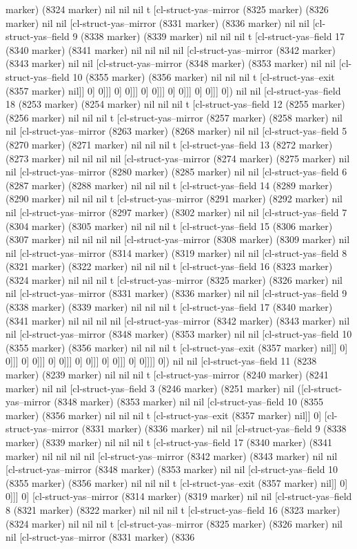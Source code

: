 {{marker) (8324 marker) nil nil nil t [cl-struct-yas--mirror (8325 marker) (8326 marker) nil nil [cl-struct-yas--mirror (8331 marker) (8336 marker) nil nil [cl-struct-yas--field 9 (8338 marker) (8339 marker) nil nil nil t [cl-struct-yas--field 17 (8340 marker) (8341 marker) nil nil nil nil [cl-struct-yas--mirror (8342 marker) (8343 marker) nil nil [cl-struct-yas--mirror (8348 marker) (8353 marker) nil nil [cl-struct-yas--field 10 (8355 marker) (8356 marker) nil nil nil t [cl-struct-yas--exit (8357 marker) nil]] 0] 0]]] 0] 0]]] 0] 0]]] 0] 0]]] 0] 0]]] 0]) nil nil [cl-struct-yas--field 18 (8253 marker) (8254 marker) nil nil nil t [cl-struct-yas--field 12 (8255 marker) (8256 marker) nil nil nil t [cl-struct-yas--mirror (8257 marker) (8258 marker) nil nil [cl-struct-yas--mirror (8263 marker) (8268 marker) nil nil [cl-struct-yas--field 5 (8270 marker) (8271 marker) nil nil nil t [cl-struct-yas--field 13 (8272 marker) (8273 marker) nil nil nil nil [cl-struct-yas--mirror (8274 marker) (8275 marker) nil nil [cl-struct-yas--mirror (8280 marker) (8285 marker) nil nil [cl-struct-yas--field 6 (8287 marker) (8288 marker) nil nil nil t [cl-struct-yas--field 14 (8289 marker) (8290 marker) nil nil nil t [cl-struct-yas--mirror (8291 marker) (8292 marker) nil nil [cl-struct-yas--mirror (8297 marker) (8302 marker) nil nil [cl-struct-yas--field 7 (8304 marker) (8305 marker) nil nil nil t [cl-struct-yas--field 15 (8306 marker) (8307 marker) nil nil nil nil [cl-struct-yas--mirror (8308 marker) (8309 marker) nil nil [cl-struct-yas--mirror (8314 marker) (8319 marker) nil nil [cl-struct-yas--field 8 (8321 marker) (8322 marker) nil nil nil t [cl-struct-yas--field 16 (8323 marker) (8324 marker) nil nil nil t [cl-struct-yas--mirror (8325 marker) (8326 marker) nil nil [cl-struct-yas--mirror (8331 marker) (8336 marker) nil nil [cl-struct-yas--field 9 (8338 marker) (8339 marker) nil nil nil t [cl-struct-yas--field 17 (8340 marker) (8341 marker) nil nil nil nil [cl-struct-yas--mirror (8342 marker) (8343 marker) nil nil [cl-struct-yas--mirror (8348 marker) (8353 marker) nil nil [cl-struct-yas--field 10 (8355 marker) (8356 marker) nil nil nil t [cl-struct-yas--exit (8357 marker) nil]] 0] 0]]] 0] 0]]] 0] 0]]] 0] 0]]] 0] 0]]] 0] 0]]]] 0]) nil nil [cl-struct-yas--field 11 (8238 marker) (8239 marker) nil nil nil t [cl-struct-yas--mirror (8240 marker) (8241 marker) nil nil [cl-struct-yas--field 3 (8246 marker) (8251 marker) nil ([cl-struct-yas--mirror (8348 marker) (8353 marker) nil nil [cl-struct-yas--field 10 (8355 marker) (8356 marker) nil nil nil t [cl-struct-yas--exit (8357 marker) nil]] 0] [cl-struct-yas--mirror (8331 marker) (8336 marker) nil nil [cl-struct-yas--field 9 (8338 marker) (8339 marker) nil nil nil t [cl-struct-yas--field 17 (8340 marker) (8341 marker) nil nil nil nil [cl-struct-yas--mirror (8342 marker) (8343 marker) nil nil [cl-struct-yas--mirror (8348 marker) (8353 marker) nil nil [cl-struct-yas--field 10 (8355 marker) (8356 marker) nil nil nil t [cl-struct-yas--exit (8357 marker) nil]] 0] 0]]] 0] [cl-struct-yas--mirror (8314 marker) (8319 marker) nil nil [cl-struct-yas--field 8 (8321 marker) (8322 marker) nil nil nil t [cl-struct-yas--field 16 (8323 marker) (8324 marker) nil nil nil t [cl-struct-yas--mirror (8325 marker) (8326 marker) nil nil [cl-struct-yas--mirror (8331 marker) (8336 }}
